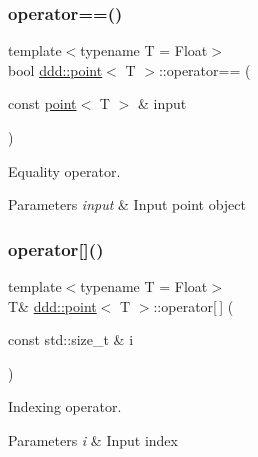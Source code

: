 \subsubsection{\texorpdfstring{operator==()}{operator==()}}
{\footnotesize\ttfamily template$<$typename T = Float$>$ \\
bool \hyperlink{classddd_1_1point}{ddd\+::point}$<$ T $>$\+::operator== (\begin{DoxyParamCaption}\item[{const \hyperlink{classddd_1_1point}{point}$<$ T $>$ \&}]{input }\end{DoxyParamCaption})\hspace{0.3cm}{\ttfamily [inline]}}



Equality operator. 


\begin{DoxyParams}{Parameters}
{\em input} & Input point object \\
\hline
\end{DoxyParams}
\mbox{\label{classddd_1_1point_aabf1454e1f0496fb70c1e62852aa2595}} 
\subsubsection{\texorpdfstring{operator[]()}{operator[]()}\hspace{0.1cm}{\footnotesize\ttfamily [1/2]}}
{\footnotesize\ttfamily template$<$typename T = Float$>$ \\
T\& \hyperlink{classddd_1_1point}{ddd\+::point}$<$ T $>$\+::operator\mbox{[}$\,$\mbox{]} (\begin{DoxyParamCaption}\item[{const std\+::size\+\_\+t \&}]{i }\end{DoxyParamCaption})\hspace{0.3cm}{\ttfamily [inline]}}



Indexing operator. 


\begin{DoxyParams}{Parameters}
{\em i} & Input index \\
\hline
\end{DoxyParams}
\mbox{\label{classddd_1_1point_a320e2bfca11915c5ebb9ed0581a3cab1}} 
